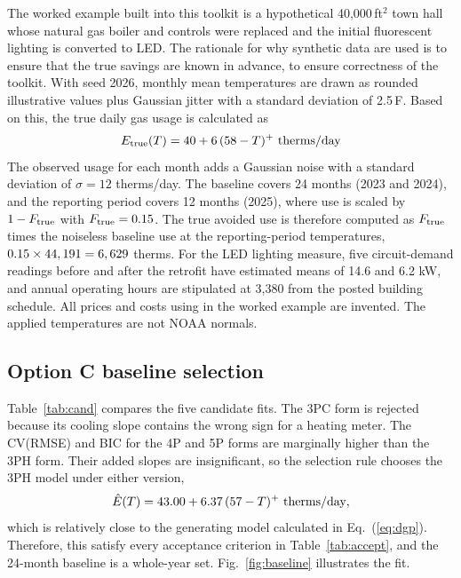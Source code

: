 \documentclass[10pt,twocolumn,letterpaper]{article}
\begin{document}
The worked example built into this toolkit is a hypothetical 40,000\,ft$^2$ town hall whose natural gas boiler and controls were replaced and the initial fluorescent lighting is converted to LED. The rationale for why synthetic data are used is to ensure that the true savings are known in advance, to ensure correctness of the toolkit. With seed 2026, monthly mean temperatures are drawn as rounded illustrative values plus Gaussian jitter with a standard deviation of 2.5\,F. Based on this, the true daily gas usage is calculated as
\begin{equation}
E_{\rm true}(T)=40+6\,(58-T)^{+}\ \text{therms/day}
\label{eq:dgp}
\end{equation}
The observed usage for each month adds a Gaussian noise with a standard deviation of $\sigma=12$ therms/day. The baseline covers 24 months (2023 and 2024), and the reporting period covers 12 months (2025), where use is scaled by $1-F_{\rm true}$ with $F_{\rm true}=0.15$. The true avoided use is therefore computed as $F_{\rm true}$ times the noiseless baseline use at the reporting-period temperatures, $0.15\times44,191=6,629$ therms. For the LED lighting measure, five circuit-demand readings before and after the retrofit have estimated means of 14.6 and 6.2 kW, and annual operating hours are stipulated at 3,380 from the posted building schedule. All prices and costs using in the worked example are invented. The applied temperatures are not NOAA normals.

\subsection{Option C baseline selection}

Table~\ref{tab:cand} compares the five candidate fits. The 3PC form is rejected because its cooling slope contains the wrong sign for a heating meter. The CV(RMSE) and BIC for the 4P and 5P forms are marginally higher than the 3PH form. Their added slopes are insignificant, so the selection rule chooses the 3PH model under either version,
\begin{equation}
\hat E(T)=\EquationIntercept+\EquationSlope\,(\EquationCp-T)^{+}\ \text{therms/day},
\end{equation}
which is relatively close to the generating model calculated in Eq.~(\ref{eq:dgp}). Therefore, this satisfy every acceptance criterion in Table~\ref{tab:accept}, and the 24-month baseline is a whole-year set. Fig.~\ref{fig:baseline} illustrates the fit.
\end{document}
